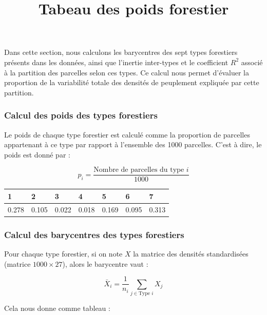 \documentclass{article}
\begin{document}
Dans cette section, nous calculons les barycentres des sept types forestiers présents dans les données, ainsi que l'inertie inter-types et le coefficient $R^2$ associé à la partition des parcelles selon ces types. Ce calcul nous permet d'évaluer la proportion de la variabilité totale des densités de peuplement expliquée par cette partition.

\subsubsection{Calcul des poids des types forestiers}
Le poids de chaque type forestier est calculé comme la proportion de parcelles appartenant à ce type par rapport à l'ensemble des 1000 parcelles. C'est à dire, le poids est donné par :

\[
p_i = \frac{\text{Nombre de parcelles du type } i}{1000}
\]

\begin{table}[H]
    \center
    \title{Tabeau des poids forestier}
    \begin{tabular}{|l|l|l|l|l|l|l|}
    \hline
    1     & 2     & 3     & 4     & 5     & 6     & 7     \\ \hline
    0.278 & 0.105 & 0.022 & 0.018 & 0.169 & 0.095 & 0.313 \\ \hline
    \end{tabular}
    \end{table}


\subsubsection{Calcul des barycentres des types forestiers}
Pour chaque type forestier, si on note $X$ la matrice des densités standardisées (matrice $1000 \times 27$), alors le barycentre vaut :

\[
\bar{X}_i = \frac{1}{n_i} \sum_{j \in \text{Type } i} X_j
\]

Cela nous donne comme tableau :
\end{document}
